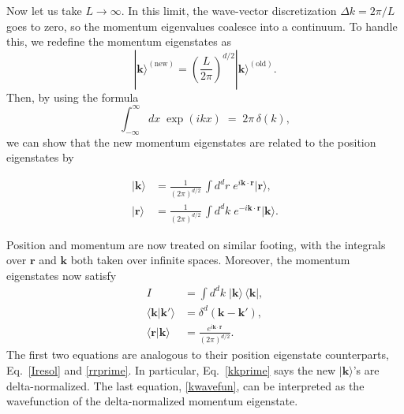 \documentclass[prx,12pt]{revtex4-2}
\begin{document}
Now let us take $L \rightarrow \infty$.  In this limit, the
wave-vector discretization $\Delta k = 2\pi / L$ goes to zero, so the
momentum eigenvalues coalesce into a continuum.  To handle this, we
redefine the momentum eigenstates as
\begin{equation}
  |\mathbf{k}\rangle^{(\textrm{new})} = \left(\frac{L}{2\pi}\right)^{d/2} |\mathbf{k}\rangle^{(\textrm{old})}.
\end{equation}
Then, by using the formula
\begin{equation}
  \int_{-\infty}^\infty dx\; \exp(ikx) \;=\; 2\pi\, \delta(k),
\end{equation}
we can show that the new momentum eigenstates are related to the
position eigenstates by
\begin{framed}
  \begin{align}
      |\mathbf{k}\rangle &= \frac{1}{(2\pi)^{d/2}} \, \int d^dr \; e^{i\mathbf{k}\cdot\mathbf{r}} |\mathbf{r}\rangle, \label{kcontdef} \\
      |\mathbf{r}\rangle &= \frac{1}{(2\pi)^{d/2}} \, \int d^dk \; e^{-i\mathbf{k}\cdot\mathbf{r}} |\mathbf{k}\rangle. \label{rcontdef}
  \end{align}
\end{framed}
\vskip -0.1in
\noindent
Position and momentum are now treated on similar footing, with the
integrals over $\mathbf{r}$ and $\mathbf{k}$ both taken over infinite
spaces.  Moreover, the momentum eigenstates now satisfy
\begin{align}
  I &= \int d^dk \;|\mathbf{k}\rangle\,\langle\mathbf{k}|, \label{Iresolk} \\
  \langle\mathbf{k}|\mathbf{k}'\rangle &= \delta^d(\mathbf{k}-\mathbf{k}'),
  \label{kkprime} \\
  \langle\mathbf{r}|\mathbf{k}\rangle &= \frac{e^{i\mathbf{k}\cdot\mathbf{r}}}{(2\pi)^{d/2}}. \label{kwavefun}
\end{align}
The first two equations are analogous to their position eigenstate
counterparts, Eq.~\eqref{Iresol} and \eqref{rrprime}.  In particular,
Eq.~\eqref{kkprime} says the new $|\mathbf{k}\rangle$'s are
delta-normalized.  The last equation, \eqref{kwavefun}, can be
interpreted as the wavefunction of the delta-normalized momentum
eigenstate.
\end{document}
